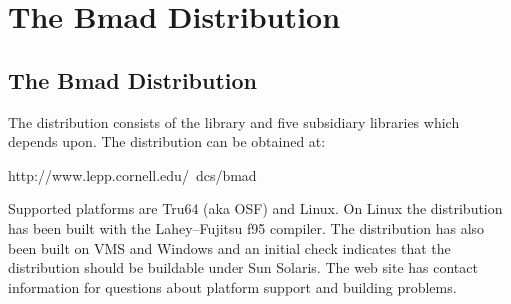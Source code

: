 \chapter{The Bmad Distribution}
\label{c:distribution}

\section {The Bmad Distribution}
\label{s:libs}

The \bmad distribution consists of the \bmad library and five subsidiary
libraries which \bmad depends upon. The \bmad distribution can be obtained at:
\begin{example}
    http://www.lepp.cornell.edu/~dcs/bmad
\end{example}
Supported platforms are Tru64 (aka OSF) and Linux. On Linux the \bmad
distribution has been built with the Lahey--Fujitsu f95 compiler. The
\bmad distribution has also been built on VMS and Windows and an
initial check indicates that the distribution should be buildable
under Sun Solaris. The \bmad web site has contact information for
questions about platform support and building problems.


